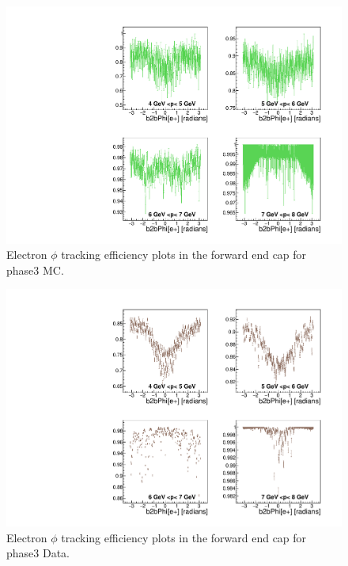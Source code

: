 \documentclass[a4paper,11pt,twosided,final,german,openbib,pdftex,listof=totoc,bibliography=totoc]{scrbook}
\begin{document}
\begin{appendix}
\begin{figure}[!htbp]
	\centering
	\includegraphics[width=\textwidth]{Plots/master3/xPMPhiemFC_MCP3}
	\caption[Momentum $\phi$ Electron Forward End Cap Efficiency Phase3 MC]{Electron $\phi$ tracking efficiency plots in the forward end cap for phase3 MC.}
	\label{plt:PMPhiemFC3_MC}
\end{figure}


\begin{figure}[!htbp]
	\centering
	\includegraphics[width=\textwidth]{Plots/master3/xPMPhiemFC_DataP3}
	\caption[Momentum $\phi$ Electron Forward End Cap Efficiency Phase3 Data]{Electron $\phi$ tracking efficiency plots in the forward end cap for phase3 Data.}
	\label{plt:PMPhiemFC3_Data}
\end{figure}









\end{appendix}
\end{document}
